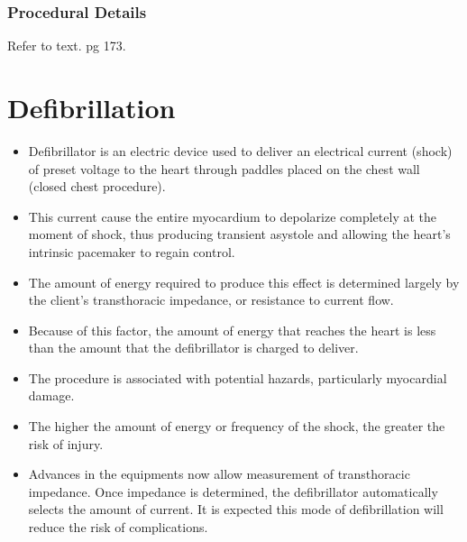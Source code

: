 \documentclass[12pt]{book}
\begin{document}
\subsubsection{Procedural Details}
Refer to text. pg 173.

\section{Defibrillation}
\begin{itemize}

\item Defibrillator is an electric device used to deliver an electrical current (shock) of preset voltage to the heart through paddles placed on the chest wall (closed chest procedure).
\item
This current cause the entire
myocardium to depolarize completely at the moment of shock, thus
producing transient asystole and allowing the heart’s intrinsic
pacemaker to regain control.
\item The amount of energy required to produce
this effect is determined largely by the client’s transthoracic
impedance, or resistance to current flow.
\item Because of this factor, the
amount of energy that reaches the heart is less than the amount that
the defibrillator is charged to deliver.

\item The procedure is associated with potential hazards, particularly
myocardial damage.
\item The higher the amount of energy or frequency
of the shock, the greater the risk of injury.
\item  Advances in the equipments
now allow measurement of transthoracic impedance. Once impedance
is determined, the defibrillator automatically selects the amount of
current. It is expected this mode of defibrillation will reduce the risk
of complications.

\end{itemize}
\end{document}
